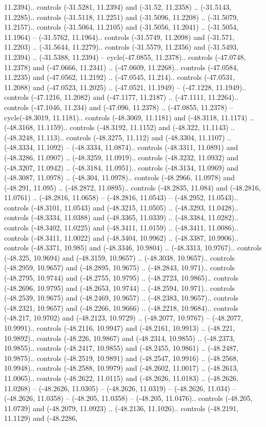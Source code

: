 \begin{scope}[shift={(2.5552, 9.9912)}]
\begin{scope}[shift={(48.1654, -14.8546)}]
11.2394).. controls (-31.5281, 11.2394) and (-31.52, 11.2358) .. (-31.5143, 11.2285).. controls (-31.5118, 11.2251) and (-31.5096, 11.2208) .. (-31.5079, 11.2157).. controls (-31.5064, 11.2105) and (-31.5056, 11.2041) .. (-31.5054, 11.1964) -- (-31.5762, 11.1964).. controls (-31.5749, 11.2098) and (-31.571, 11.2203) .. (-31.5644, 11.2279).. controls (-31.5579, 11.2356) and (-31.5493, 11.2394) .. (-31.5388, 11.2394) -- cycle(-47.0855, 11.2378).. controls (-47.0748, 11.2378) and (-47.0666, 11.2341) .. (-47.0609, 11.2268).. controls (-47.0584, 11.2235) and (-47.0562, 11.2192) .. (-47.0545, 11.214).. controls (-47.0531, 11.2088) and (-47.0523, 11.2025) .. (-47.0521, 11.1949) -- (-47.1228, 11.1949).. controls (-47.1216, 11.2082) and (-47.1177, 11.2187) .. (-47.1111, 11.2264).. controls (-47.1046, 11.234) and (-47.096, 11.2378) .. (-47.0855, 11.2378) -- cycle(-48.3019, 11.1181).. controls (-48.3069, 11.1181) and (-48.3118, 11.1174) .. (-48.3168, 11.1159).. controls (-48.3192, 11.1152) and (-48.322, 11.1143) .. (-48.3248, 11.113).. controls (-48.3275, 11.112) and (-48.3304, 11.1107) .. (-48.3334, 11.1092) -- (-48.3334, 11.0874).. controls (-48.3311, 11.0891) and (-48.3286, 11.0907) .. (-48.3259, 11.0919).. controls (-48.3232, 11.0932) and (-48.3207, 11.0942) .. (-48.3184, 11.0951).. controls (-48.3134, 11.0969) and (-48.3087, 11.0978) .. (-48.304, 11.0978).. controls (-48.2966, 11.0978) and (-48.291, 11.095) .. (-48.2872, 11.0895).. controls (-48.2835, 11.084) and (-48.2816, 11.0761) .. (-48.2816, 11.0658) -- (-48.2816, 11.0543) -- (-48.2952, 11.0543).. controls (-48.3101, 11.0543) and (-48.3215, 11.0505) .. (-48.3293, 11.0428).. controls (-48.3334, 11.0388) and (-48.3365, 11.0339) .. (-48.3384, 11.0282).. controls (-48.3402, 11.0225) and (-48.3411, 11.0159) .. (-48.3411, 11.0086).. controls (-48.3411, 11.0022) and (-48.3404, 10.9962) .. (-48.3387, 10.9906).. controls (-48.3371, 10.985) and (-48.3346, 10.9804) .. (-48.3313, 10.9767).. controls (-48.325, 10.9694) and (-48.3159, 10.9657) .. (-48.3038, 10.9657).. controls (-48.2959, 10.9657) and (-48.2895, 10.9675) .. (-48.2843, 10.971).. controls (-48.2795, 10.9744) and (-48.2755, 10.9795) .. (-48.2723, 10.9865).. controls (-48.2696, 10.9795) and (-48.2653, 10.9744) .. (-48.2594, 10.971).. controls (-48.2539, 10.9675) and (-48.2469, 10.9657) .. (-48.2383, 10.9657).. controls (-48.2321, 10.9657) and (-48.2266, 10.9666) .. (-48.2218, 10.9684).. controls (-48.217, 10.9702) and (-48.2123, 10.9729) .. (-48.2077, 10.9767) -- (-48.2077, 10.9991).. controls (-48.2116, 10.9947) and (-48.2161, 10.9913) .. (-48.221, 10.9892).. controls (-48.226, 10.9867) and (-48.2314, 10.9855) .. (-48.2373, 10.9855).. controls (-48.2417, 10.9855) and (-48.2455, 10.9861) .. (-48.2487, 10.9875).. controls (-48.2519, 10.9891) and (-48.2547, 10.9916) .. (-48.2568, 10.9948).. controls (-48.2588, 10.9979) and (-48.2602, 11.0017) .. (-48.2613, 11.0065).. controls (-48.2622, 11.0115) and (-48.2626, 11.0183) .. (-48.2626, 11.0268) -- (-48.2626, 11.0305) -- (-48.2626, 11.0319) -- (-48.2626, 11.034) -- (-48.2626, 11.0358) -- (-48.205, 11.0358) -- (-48.205, 11.0476).. controls (-48.205, 11.0739) and (-48.2079, 11.0923) .. (-48.2136, 11.1026).. controls (-48.2191, 11.1129) and (-48.2286, 
\end{scope}
\end{scope}
